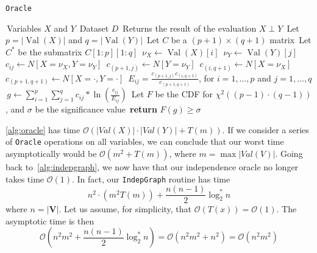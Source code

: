 \documentclass{amsart}
\DeclareMathOperator*{\Val}{\text{Val}}
\theoremstyle{plain}
\numberwithin{equation}{section}
\newcommand{\set}[1]{\mathbf{#1}}
\newcommand{\bigo}{\mathcal{O}}
\newcommand{\code}[1]{\lstinline[mathescape=true]{#1}}
\begin{document}
\begin{algorithm}[H]
  \caption{\code{Oracle}}\label{alg:oracle}
  \begin{algorithmic}[1]
    \Require\,Variables $X$ and $Y$
    \Require\,Dataset $D$
    \Ensure\,Returns the result of the evaluation $X\perp Y$
    \State\,Let $p=|\Val(X)|$ and $q=|\Val(Y)|$
    \State\,Let $C$ be a $(p+1)\times(q+1)$ matrix
    \State\,Let $C^*$ be the submatrix $C[1:p][1:q]$
      \State\,$\nu_X\gets\Val(X)[i]$
        \State\,$\nu_Y\gets\Val(Y)[j]$
        \State\,$c_{ij} \gets N[X=\nu_X,Y=\nu_Y]$
        \State\,$c_{(p+1,j)}\gets N[Y=\nu_Y]$
      \EndFor%
      \State\,$c_{(i,q+1)}\gets N[X=\nu_X]$
    \EndFor%
    \State\,$c_{(p+1,q+1)}\gets N[X=\cdot,Y=\cdot]$
    \State\,$E_{ij} = \frac{c_{(p+1,j)}c_{(i,q+1)}}{c_{(p+1,q+1)}}$, for $i=1,\ldots,p$ and
      $j=1,\ldots,q$
    \State\,$g\gets\sum_{i=1}^p\sum_{j=1}^q c_{ij}*\ln\left(\frac{c_{ij}}{E_{ij}}\right)$
    \State\,Let $F$ be the CDF for $\chi^2((p-1)\cdot(q-1))$, and $\sigma$ be the significance
      value \State\,\textbf{return} $F(g) \geq \sigma$
  \end{algorithmic}
\end{algorithm}

\autoref{alg:oracle} has time $\bigo(|Val(X)|\cdot|Val(Y)| + T(m))$. If we consider a series of
\code{Oracle} operations on all variables, we can conclude that our worst time asymptotically would
be $\bigo(m^2+T(m))$, where $m=\max |Val(V)|$. Going back to~\autoref{alg:indepgraph}, we now have
that our independence oracle no longer takes time $\bigo(1)$. In fact, our \code{IndepGraph}
routine has time
\begin{equation*}
  n^2\cdot(m^2 T(m))+\frac{n(n-1)}{2}\log_2^*n
\end{equation*}
where $n=|\set{V}|$. Let us assume, for simplicity, that $\bigo(T(x))=\bigo(1)$. The asymptotic
time is then
\begin{equation*}
  \bigo(n^2m^2 + \frac{n(n-1)}{2}\log_2^*n) = \bigo(n^2m^2 + n^2) = \bigo(n^2m^2)
\end{equation*}


\newpage
\appendix

\newpage

\printbibliography[]
\end{document}
